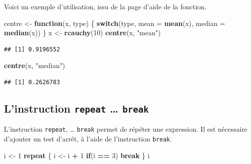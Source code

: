 \documentclass[
  11pt,
]{book}
\newenvironment{Shaded}{\begin{snugshade}}{\end{snugshade}}
\newcommand{\ControlFlowTok}[1]{\textcolor[rgb]{0.13,0.29,0.53}{\textbf{#1}}}
\newcommand{\DataTypeTok}[1]{\textcolor[rgb]{0.13,0.29,0.53}{#1}}
\newcommand{\DecValTok}[1]{\textcolor[rgb]{0.00,0.00,0.81}{#1}}
\newcommand{\KeywordTok}[1]{\textcolor[rgb]{0.13,0.29,0.53}{\textbf{#1}}}
\newcommand{\NormalTok}[1]{#1}
\newcommand{\OperatorTok}[1]{\textcolor[rgb]{0.81,0.36,0.00}{\textbf{#1}}}
\newcommand{\StringTok}[1]{\textcolor[rgb]{0.31,0.60,0.02}{#1}}
\numberwithin{equation}{section}
\numberwithin{countremarque}{section}
\begin{document}
Voici un exemple d'utilisation, issu de la page d'aide de la fonction.

\begin{Shaded}
\begin{Highlighting}[]
\NormalTok{centre \textless{}{-}}\StringTok{ }\ControlFlowTok{function}\NormalTok{(x, type) \{}
  \ControlFlowTok{switch}\NormalTok{(type,}
         \DataTypeTok{mean =} \KeywordTok{mean}\NormalTok{(x),}
         \DataTypeTok{median =} \KeywordTok{median}\NormalTok{(x))}
\NormalTok{\}}
\NormalTok{x \textless{}{-}}\StringTok{ }\KeywordTok{rcauchy}\NormalTok{(}\DecValTok{10}\NormalTok{)}
\KeywordTok{centre}\NormalTok{(x, }\StringTok{"mean"}\NormalTok{)}
\end{Highlighting}
\end{Shaded}

\begin{lstlisting}
## [1] 0.9196552
\end{lstlisting}

\begin{Shaded}
\begin{Highlighting}[]
\KeywordTok{centre}\NormalTok{(x, }\StringTok{"median"}\NormalTok{)}
\end{Highlighting}
\end{Shaded}

\begin{lstlisting}
## [1] 0.2626783
\end{lstlisting}

\hypertarget{boucles_boucles_repeat}{%
\subsection{\texorpdfstring{L'instruction \texttt{repeat} \ldots{} \texttt{break}}{L'instruction repeat \ldots{} break}}\label{boucles_boucles_repeat}}

L'instruction \texttt{repeat}, \ldots{} \texttt{break} permet de répéter une expression. Il est nécessaire d'ajouter un test d'arrêt, à l'aide de l'instruction \texttt{break}.

\begin{Shaded}
\begin{Highlighting}[]
\NormalTok{i \textless{}{-}}\StringTok{ }\DecValTok{1}
\ControlFlowTok{repeat}\NormalTok{ \{}
\NormalTok{  i \textless{}{-}}\StringTok{ }\NormalTok{i }\OperatorTok{+}\StringTok{ }\DecValTok{1}
  \ControlFlowTok{if}\NormalTok{(i }\OperatorTok{==}\StringTok{ }\DecValTok{3}\NormalTok{) }\ControlFlowTok{break}
\NormalTok{\}}
\NormalTok{i}
\end{Highlighting}
\end{Shaded}
\end{document}
